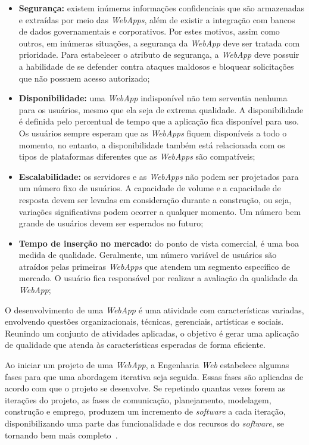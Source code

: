 \begin{itemize}
	
	\item \textbf{Segurança:} existem inúmeras informações confidenciais que são armazenadas e extraídas por meio das \textit{WebApps}, além de existir a integração com bancos de dados governamentais e corporativos. Por estes motivos, assim como outros, em inúmeras situações, a segurança da \textit{WebApp} deve ser tratada com prioridade. Para estabelecer o atributo de segurança, a \textit{WebApp} deve possuir a habilidade de se defender contra ataques maldosos e bloquear solicitações que não possuem acesso autorizado;
	
	\item \textbf{Disponibilidade:} uma \textit{WebApp} indisponível não tem serventia nenhuma para os usuários, mesmo que ela seja de extrema qualidade. A disponibilidade é definida pelo percentual de tempo que a aplicação fica disponível para uso. Os usuários sempre esperam que as \textit{WebApps} fiquem disponíveis a todo o momento, no entanto, a disponibilidade também está relacionada com os tipos de plataformas diferentes que as \textit{WebApps} são compatíveis;

	\item \textbf{Escalabilidade:} os servidores e as \textit{WebApps} não podem ser projetados para um número fixo de usuários. A capacidade de volume e a capacidade de resposta devem ser levadas em consideração durante a construção, ou seja, variações significativas podem ocorrer a qualquer momento. Um número bem grande de usuários devem ser esperados no futuro;

	\item \textbf{Tempo de inserção no mercado:} do ponto de vista comercial, é uma boa medida de qualidade. Geralmente, um número variável de usuários são atraídos pelas primeiras \textit{WebApps} que atendem um segmento específico de mercado. O usuário fica responsável por realizar a avaliação da qualidade da \textit{WebApp};

\end{itemize}

O desenvolvimento de uma \textit{WebApp} é uma atividade com características variadas, envolvendo questões organizacionais, técnicas, gerenciais, artísticas e sociais. Reunindo um conjunto de atividades aplicadas, o objetivo é gerar uma aplicação de qualidade que atenda às características esperadas de forma eficiente.

Ao iniciar um projeto de uma \textit{WebApp}, a Engenharia \textit{Web} estabelece algumas fases para que uma abordagem iterativa seja seguida. Essas fases são aplicadas de acordo com que o projeto se desenvolve. Se repetindo quantas vezes forem as iterações do projeto, as fases de comunicação, planejamento, modelagem, construção e emprego, produzem um incremento de \textit{software} a cada iteração, disponibilizando uma parte das funcionalidade e dos recursos do \textit{software}, se tornando bem mais completo~\cite{pressman:es11}.

